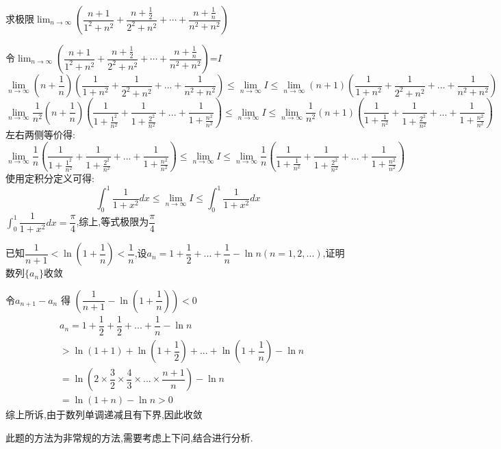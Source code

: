 \documentclass[8pt a4paper, oneside, UTF8]{ctexbook}
\begin{document}
\begin{sloppypar}
    \begin{problem}
        求极限$\lim_{n\to\infty}\left(\dfrac{n+1}{1^{2}+n^{2}}+\dfrac{n+\frac{1}{2}}{2^{2}+n^{2}}+\cdots+\dfrac{n+\frac{1}{n}}{n^{2}+n^{2}}\right)$
    \end{problem}
    \begin{solution}
        令$\lim_{n\to\infty}\left(\dfrac{n+1}{1^{2}+n^{2}}+\dfrac{n+\frac{1}{2}}{2^{2}+n^{2}}+\cdots+\dfrac{n+\frac{1}{n}}{n^{2}+n^{2}}\right)$=$I$
            $$
                \lim_{n \to \infty} (n+\frac{1}{n})(\dfrac{1}{1+n^2}+\dfrac{1}{2^2+n^2}+...+\dfrac{1}{n^2+n^2}) \leqslant   \lim_{n\to \infty}I \leqslant \lim_{n \to \infty} (n+1)(\dfrac{1}{1+n^2}+\dfrac{1}{2^2+n^2}+...+\dfrac{1}{n^2+n^2})
            $$
            $$
                \lim_{n \to \infty} \dfrac{1}{n^2}(n+\frac{1}{n})(\dfrac{1}{1+\frac{1^2}{n^2}}+\dfrac{1}{1+\frac{2^2}{n^2}}+...+\dfrac{1}{1+\frac{n^2}{n^2}}) \leqslant \lim_{n\to \infty}I \leqslant \lim_{n \to \infty}\frac{1}{n^2} (n+1)(\dfrac{1}{1+\frac{1}{n^2}}+\dfrac{1}{1+\frac{2^2}{n^2}}+...+\dfrac{1}{1+\frac{n^2}{n^2}})
            $$
            左右两侧等价得:
            $$
            \lim_{n \to \infty} \dfrac{1}{n}(\dfrac{1}{1+\frac{1^2}{n^2}}+\dfrac{1}{1+\frac{2^2}{n^2}}+...+\dfrac{1}{1+\frac{n^2}{n^2}}) \leqslant \lim_{n\to \infty} I \leqslant \lim_{n \to \infty}\frac{1}{n}(\dfrac{1}{1+\frac{1}{n^2}}+\dfrac{1}{1+\frac{2^2}{n^2}}+...+\dfrac{1}{1+\frac{n^2}{n^2}})
            $$
            使用定积分定义可得:
            $$
            \int_0 ^1 \dfrac{1}{1+x^2}dx \leqslant \lim_{n\to \infty} I \leqslant \int_0^1 \dfrac{1}{1+x^2}dx
            $$
        $\int_0 ^1 \dfrac{1}{1+x^2}dx=\dfrac{\pi}{4}$,综上,等式极限为$\dfrac{\pi}{4}$
    \end{solution}
    \begin{problem}
        已知$\dfrac1{n+1}<\ln(1+\dfrac1n)<\dfrac1n$,设$a_n=1+\dfrac12+...+\dfrac1n-\ln n(n=1,2,...)$,证明数列$\{a_n\}$收敛
    \end{problem}
    \begin{solution}
        令$a_{n+1}-a_n$ 得 $(\dfrac{1}{n+1}-\ln(1+\dfrac{1}{n}))<0$
        \begin{align*}
          & a_n= 1+\dfrac{1}{2}+\dfrac{1}{2}+...+\dfrac{1}{n}-\ln n\\
          & > \ln(1+1)+\ln(1+\dfrac{1}{2})+...+\ln(1+\dfrac{1}{n})-\ln n \\
          & =\ln(2 \times \dfrac{3}{2} \times \dfrac{4}{3} \times ... \times \dfrac{n+1}{n})-\ln n\\
          & = \ln(1+n)-\ln n >0
        \end{align*}
    综上所诉,由于数列单调递减且有下界,因此收敛
    \end{solution}
    \begin{note}
        此题的方法为非常规的方法,需要考虑上下问,结合进行分析.
    \end{note}

\end{sloppypar}
\end{document}
